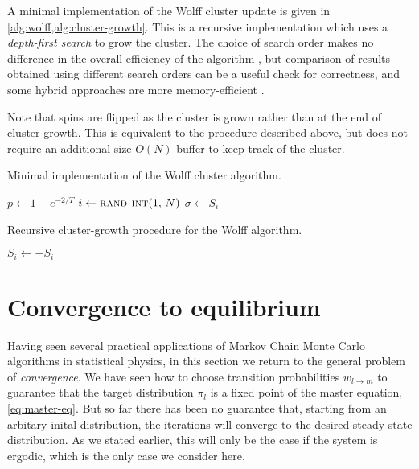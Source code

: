 A minimal implementation of the Wolff cluster update is given in
\cref{alg:wolff,alg:cluster-growth}. This is a recursive implementation which
uses a \emph{depth-first search} to grow the cluster. The choice of search
order makes no difference in the overall efficiency of the algorithm
\autocite{newman1999monte}, but comparison of results obtained using different
search orders can be a useful check for correctness, and some hybrid approaches
are more memory-efficient \autocite{martin2004hybrid}.

Note that spins are flipped as the cluster is grown rather than at the end of
cluster growth. This is equivalent to the procedure described above, but does
not require an additional size $O(N)$ buffer to keep track of the cluster.

\begin{algorithm}
\caption{Minimal implementation of the Wolff cluster algorithm.}
\label{alg:wolff}
\begin{algorithmic}
  \State $p \gets 1-e^{-2/T}$
  \State $i \gets \Call{rand-int}{1,\,N}$
  \State $\sigma \gets S_i$
  \State {}
\EndProcedure
\end{algorithmic}
\end{algorithm}

\begin{algorithm}
\caption{Recursive cluster-growth procedure for the Wolff algorithm.}
\label{alg:cluster-growth}
\begin{algorithmic}
  \State $S_i \gets -S_i$
      \State {}
    \EndIf
  \EndFor
\EndProcedure
\end{algorithmic}
\end{algorithm}


\section{Convergence to equilibrium}

Having seen several practical applications of Markov Chain Monte Carlo
algorithms in statistical physics, in this section we return to the general
problem of \emph{convergence}. We have seen how to choose transition
probabilities $w_{l \to m}$ to guarantee that the target distribution $\pi_l$
is a fixed point of the master equation, \cref{eq:master-eq}. But so far there
has been no guarantee that, starting from an arbitary inital distribution, the
iterations will converge to the desired steady-state distribution. As we stated
earlier, this will only be the case if the system is ergodic, which is the only
case we consider here.

